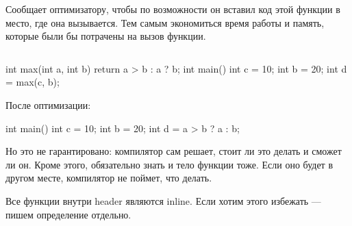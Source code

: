 Сообщает оптимизатору, чтобы по возможности он вставил код этой функции в место, где она вызывается.
Тем самым экономиться время работы и память, которые были бы потрачены на вызов функции.

$ $

\begin{minipage}{0.45\textwidth}
\begin{ccode}
int max(int a, int b) {
    return a > b : a ? b;
}
int main() {
    int c = 10;
    int b = 20;
    int d = max(c, b);
}
\end{ccode}
\end{minipage}
\hfill
\begin{minipage}{0.45\textwidth}
    После оптимизации:
\begin{ccode}
int main() {
    int c = 10;
    int b = 20;
    int d = a > b ? a : b;
}
\end{ccode}
\end{minipage}

Но это не гарантировано: компилятор сам решает, стоит ли это делать и сможет ли он. Кроме этого, обязательно знать и тело функции тоже. Если оно будет в другом месте, компилятор не поймет, что делать.

Все функции внутри header являются inline. Если хотим этого избежать --- пишем определение отдельно.
